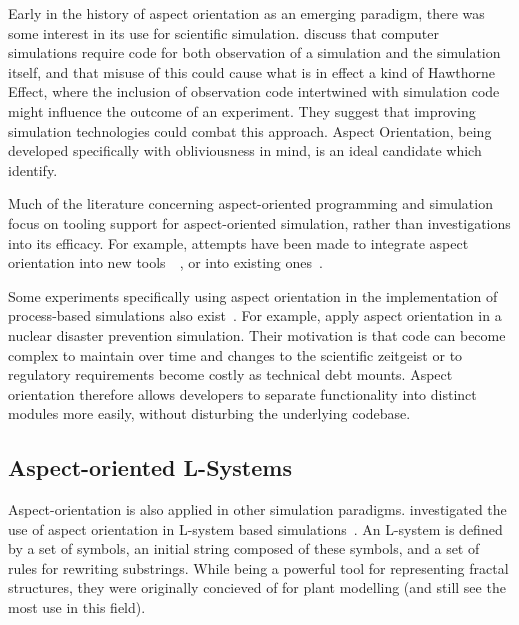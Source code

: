 Early in the history of aspect orientation as an emerging paradigm, there was
some interest in its use for scientific simulation. \cite{gulyas1999use} discuss
that computer simulations require code for both observation of a simulation and
the simulation itself, and that misuse of this could cause what is in effect a
kind of Hawthorne Effect, where
the inclusion of observation code intertwined with simulation code might
influence the outcome of an experiment. They suggest that improving simulation
technologies could combat this approach. Aspect Orientation, being developed
specifically with obliviousness in mind, is an ideal candidate which
\citeauthor{gulyas1999use} identify.

Much of the literature concerning aspect-oriented programming and simulation
focus on tooling support for aspect-oriented simulation, rather than
investigations into its efficacy. For example, attempts have been made to
integrate aspect orientation into new
tools~\cite{DEVSaspectorientation2008aksu}~,
or into existing ones~\cite{chibani2019using}. 

Some experiments specifically using aspect orientation in the implementation of
process-based simulations also exist\cite{Ionescu_2009}~. For
example, \citeauthor{Ionescu_2009} apply aspect orientation in a nuclear
disaster prevention simulation. Their motivation is that code can become complex
to maintain over time and changes to the scientific zeitgeist or to regulatory
requirements become costly as technical debt mounts. Aspect orientation
therefore allows developers to separate functionality into distinct modules more
easily, without disturbing the underlying codebase.

\subsection{Aspect-oriented L-Systems}
Aspect-orientation is also applied in other simulation paradigms.
\citeauthor{Cieslak_2011} investigated the use of aspect orientation in L-system
based simulations~\cite{Cieslak_2011}. An L-system\cite{lindenmayer1968lsystem}
is defined by a set of symbols, an initial string composed of these symbols, and
a set of rules for rewriting substrings. While being a powerful tool for
representing fractal structures, they were originally concieved of for plant
modelling (and still see the most use in this field).

